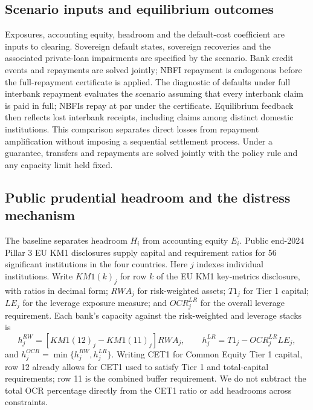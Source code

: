\subsection{Scenario inputs and equilibrium outcomes}
Exposures, accounting equity, headroom and the default-cost coefficient are inputs to clearing. Sovereign default states, sovereign recoveries and the associated private-loan impairments are specified by the scenario. Bank credit events and repayments are solved jointly; NBFI repayment is endogenous before the full-repayment certificate is applied. The diagnostic of defaults under full interbank repayment evaluates the scenario assuming that every interbank claim is paid in full; NBFIs repay at par under the certificate. Equilibrium feedback then reflects lost interbank receipts, including claims among distinct domestic institutions. This comparison separates direct losses from repayment amplification without imposing a sequential settlement process. Under a guarantee, transfers and repayments are solved jointly with the policy rule and any capacity limit held fixed.

\subsection{Public prudential headroom and the distress mechanism}

The baseline separates headroom $H_i$ from accounting equity $E_i$. Public end-2024 Pillar 3 EU KM1 disclosures supply capital and requirement ratios for 56 significant institutions in the four countries. Here $j$ indexes individual institutions. Write $KM1(k)_j$ for row $k$ of the EU KM1 key-metrics disclosure, with ratios in decimal form; $RWA_j$ for risk-weighted assets; $T1_j$ for Tier 1 capital; $LE_j$ for the leverage exposure measure; and $OCR_j^{LR}$ for the overall leverage requirement. Each bank's capacity against the risk-weighted and leverage stacks is
\[
 h_j^{RW}=[KM1(12)_j-KM1(11)_j]RWA_j,\qquad
 h_j^{LR}=T1_j-OCR_j^{LR}LE_j,
\]
and $h_j^{OCR}=\min\{h_j^{RW},h_j^{LR}\}$. Writing CET1 for Common Equity Tier 1 capital, row 12 already allows for CET1 used to satisfy Tier 1 and total-capital requirements; row 11 is the combined buffer requirement. We do not subtract the total OCR percentage directly from the CET1 ratio or add headrooms across constraints.

